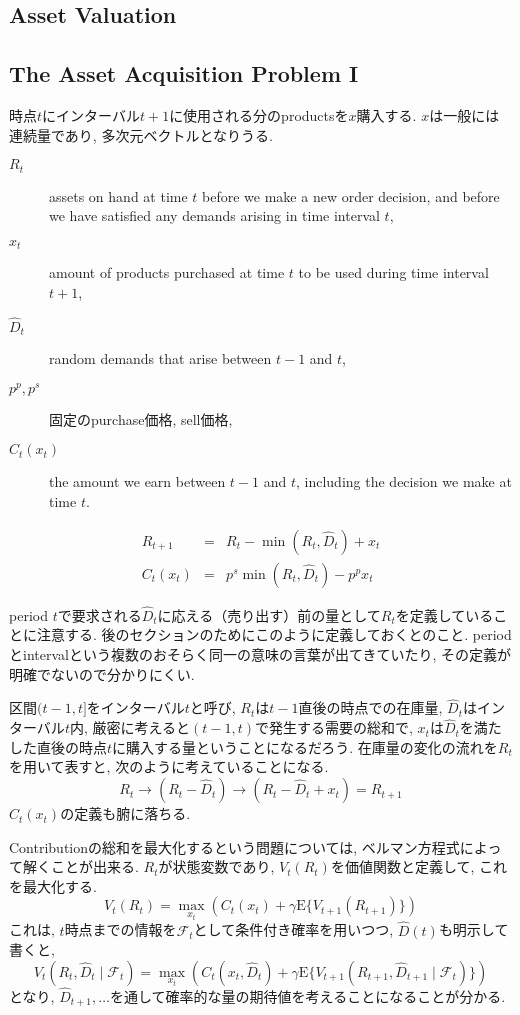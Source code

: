 \documentclass[11pt]{jsbook}
\begin{document}
\subsection{Asset Valuation}

\subsection{The Asset Acquisition Problem I}
時点$t$にインターバル$t+1$に使用される分のproductsを$x$購入する. 
$x$は一般には連続量であり, 多次元ベクトルとなりうる.

\begin{description}
	\item[$R_t$] assets on hand at time $t$ before we make a new order decision, 
	and before we have satisfied any demands arising in time interval $t$,
	\item[$x_t$] amount of products purchased at time $t$ to be used during time interval $t+1$,
	\item[$\hat{D}_t$] random demands that arise between $t-1$ and $t$,
	\item[$p^p, p^s$] 固定のpurchase価格, sell価格,
	\item[$C_t(x_t)$] the amount we earn between $t-1$ and $t$, including the decision
	we make at time $t$.
\end{description}
\begin{eqnarray}
	R_{t+1}  &=& R_t - \min (R_t, \hat{D}_t) + x_t \\
	C_t(x_t) &=& p^s \min (R_t, \hat{D}_t) - p^p x_t 
\end{eqnarray}

period $t$で要求される$\hat{D}_{t}$に応える（売り出す）前の量として$R_t$を定義していることに注意する.
後のセクションのためにこのように定義しておくとのこと. 
periodとintervalという複数のおそらく同一の意味の言葉が出てきていたり, その定義が明確でないので分かりにくい.

区間$(t-1,t]$をインターバル$t$と呼び, $R_t$は$t-1$直後の時点での在庫量,
$\hat{D}_t$はインターバル$t$内, 厳密に考えると$(t-1, t)$で発生する需要の総和で,
$x_t$は$\hat{D}_t$を満たした直後の時点$t$に購入する量ということになるだろう.
在庫量の変化の流れを$R_t$を用いて表すと, 次のように考えていることになる.
\[R_t \rightarrow (R_t - \hat{D}_{t}) \rightarrow (R_t - \hat{D}_{t} + x_t) = R_{t+1}\]
$C_t(x_t)$の定義も腑に落ちる. 

Contributionの総和を最大化するという問題については, ベルマン方程式によって解くことが出来る.
$R_t$が状態変数であり, $V_t(R_t)$を価値関数と定義して, これを最大化する.
\begin{equation}
	V_t (R_t) = \max_{x_t} \left( C_t(x_t) + \gamma \mathrm{E} \{V_{t+1} (R_{t+1}) \} \right)
\end{equation}
これは, $t$時点までの情報を$\mathcal{F}_t$として条件付き確率を用いつつ, $\hat{D}(t)$も明示して書くと,
\begin{equation}
	V_t (R_t, \hat{D}_t \mid \mathcal{F}_t) =
	 \max_{x_t} \left( C_t(x_t, \hat{D}_t) +
	  \gamma \mathrm{E} \{V_{t+1} (R_{t+1}, \hat{D}_{t+1} \mid \mathcal{F}_t ) \} \right)
\end{equation}
となり, $\hat{D}_{t+1}, \dots$を通して確率的な量の期待値を考えることになることが分かる.
\end{document}
